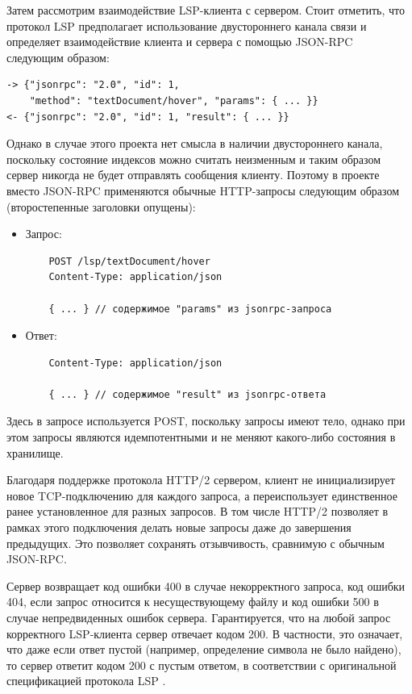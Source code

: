Затем рассмотрим взаимодействие LSP-клиента с сервером. Стоит отметить, что протокол LSP \cite{languageserver} предполагает использование двустороннего канала связи и определяет взаимодействие клиента и сервера с помощью JSON-RPC \cite{jsonrpc} следующим образом:

\begin{verbatim}
-> {"jsonrpc": "2.0", "id": 1,
    "method": "textDocument/hover", "params": { ... }}
<- {"jsonrpc": "2.0", "id": 1, "result": { ... }}
\end{verbatim}

Однако в случае этого проекта нет смысла в наличии двустороннего канала, поскольку состояние индексов можно считать неизменным и таким образом сервер никогда не будет отправлять сообщения клиенту. Поэтому в проекте вместо JSON-RPC применяются обычные HTTP-запросы следующим образом (второстепенные заголовки опущены):
\begin{itemize}
    \item Запрос:
    \begin{verbatim}
    POST /lsp/textDocument/hover
    Content-Type: application/json
    
    { ... } // содержимое "params" из jsonrpc-запроса
    \end{verbatim}
    
    \item Ответ:
    \begin{verbatim}
    Content-Type: application/json
    
    { ... } // содержимое "result" из jsonrpc-ответа
    \end{verbatim}
\end{itemize}

Здесь в запросе используется POST, поскольку запросы имеют тело, однако при этом запросы являются идемпотентными и не меняют какого-либо состояния в хранилище.

Благодаря поддержке протокола HTTP/2 \cite{rfc9113} сервером, клиент не инициализирует новое TCP-подключению для каждого запроса, а переиспользует единственное ранее установленное для разных запросов. В том числе HTTP/2 позволяет в рамках этого подключения делать новые запросы даже до завершения предыдущих. Это позволяет сохранять отзывчивость, сравнимую с обычным JSON-RPC.

Сервер возвращает код ошибки 400 в случае некорректного запроса, код ошибки 404, если запрос относится к несуществующему файлу и код ошибки 500 в случае непредвиденных ошибок сервера. Гарантируется, что на любой запрос корректного LSP-клиента сервер отвечает кодом 200. В частности, это означает, что даже если ответ пустой (например, определение символа не было найдено), то сервер ответит кодом 200 с пустым ответом, в соответствии с оригинальной спецификацией протокола LSP \cite{languageserver}. 

